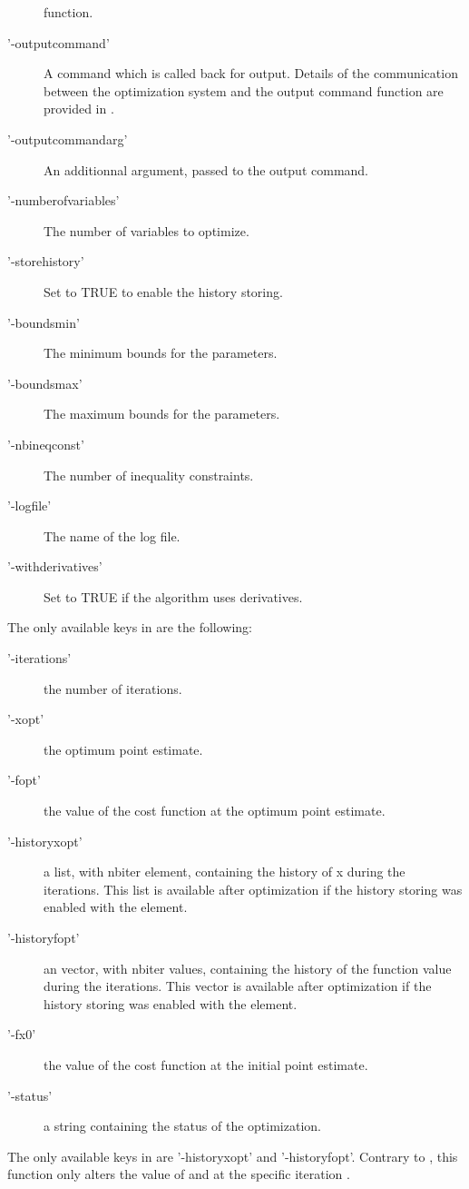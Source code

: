 \begin{Details}
\begin{description}
function.
\item['-outputcommand'] A command which is called back for output. Details
of the communication between the optimization system and the output
command function are provided in      
.
\item['-outputcommandarg'] An additionnal argument, passed to the output
command.
\item['-numberofvariables'] The number of variables to optimize.
\item['-storehistory'] Set to TRUE to enable the history storing.
\item['-boundsmin'] The minimum bounds for the parameters.
\item['-boundsmax'] The maximum bounds for the parameters.
\item['-nbineqconst'] The number of inequality constraints.
\item['-logfile'] The name of the log file.
\item['-withderivatives'] Set to TRUE if the algorithm uses derivatives.

\end{description}


The only available keys in  are the following:\begin{description}

\item['-iterations'] the number of iterations.
\item['-xopt'] the optimum point estimate.
\item['-fopt'] the value of the cost function at the optimum point 
estimate.
\item['-historyxopt'] a list, with nbiter element, containing the history
of x during the iterations. This list is available after optimization if
the history storing was enabled with the 
element.
\item['-historyfopt'] an vector, with nbiter values, containing the history
of the function value during the iterations. This vector is available
after optimization if the history storing was enabled with the
 element.
\item['-fx0'] the value of the cost function at the initial point
estimate.
\item['-status'] a string containing the status of the optimization.

\end{description}


The only available keys in  are '-historyxopt' and
'-historyfopt'. Contrary to , this function only alters
the value of  and  at the specific
iteration .
\end{Details}
